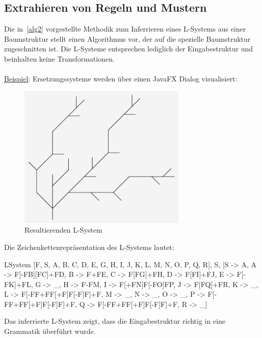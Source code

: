 \subsection*{Extrahieren von Regeln und Mustern}
Die in~\ref{alg2} vorgestellte Methodik zum Inferrieren eines L-Systems aus einer Baumstruktur
stellt einen Algorithmus vor, der auf die spezielle Baumstruktur zugeschnitten ist.
Die L-Systeme entsprechen lediglich der Eingabestruktur und beinhalten keine Transformationen.\\~\\
\underline{Beispiel}: Ersetzungssysteme werden über einen JavaFX Dialog visualisiert:
\begin{figure}[H]
    \centering
    \includegraphics[width=8cm]{../images/evaluierung_inferrieren_lsystem.png}
    \caption{Resultierenden L-System}
\end{figure}
Die Zeichenkettenrepräsentation des L-Systems lautet:
\begin{csource}
LSystem{
    [F, S, A, B, C, D, E, G, H, I, J, K, L, M, N, O, P, Q, R],
    S,
    [S -> A, A -> F[-FB][FC]+FD, B -> F+FE, C -> F[FG]+FH, D -> F[FI]+FJ, E -> F[-FK]+FL, G -> _, H -> F-FM, I -> F[+FN]F[-FO]FP, J -> F[FQ]+FR, K -> _, L -> F[-FF+FF[+F]F[-F]F]+F, M -> _, N -> _, O -> _, P -> F[-FF+FF[+F]F[-F]F]+F, Q -> F[-FF+FF[+F]F[-F]F]+F, R -> _]
}
\end{csource}

Das inferrierte L-System zeigt, dass die Eingabestruktur richtig in eine Grammatik überführt wurde.

